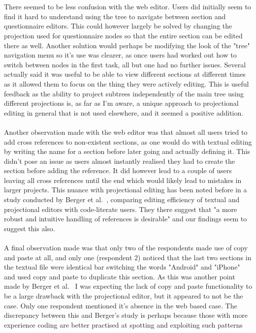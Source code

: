 \documentclass{article}
\begin{document}
\\
\\
There seemed to be less confusion with the web editor. Users did initially seem to find it hard to understand using the tree to navigate between section and questionnaire editors. This could however largely be solved by changing the projection used for questionnaire nodes so that the entire section can be edited there as well. Another solution would perhaps be modifying the look of the "tree" navigation menu so it's use was clearer, as once users had worked out how to switch between nodes in the first task, all but one had no further issues. Several actually said it was useful to be able to view different sections at different times as it allowed them to focus on the thing they were actively editing. This is useful feedback as the ability to project subtrees independently of the main tree using different projections is, as far as I'm aware, a unique approach to projectional editing in general that is not used elsewhere, and it seemed a positive addition.
\\
\\
Another observation made with the web editor was that almost all users tried to add cross references to non-existent sections, as one would do with textual editing by writing the name for a section before later going and actually defining it. This didn't pose an issue as users almost instantly realised they had to create the section before adding the reference. It did however lead to a couple of users leaving all cross references until the end which would likely lead to mistakes in larger projects. This nuance with projectional editing has been noted before in a study conducted by Berger et al.~\cite{projEditControlledExperiment}, comparing editing efficiency of textual and projectional editors with code-literate users. They there suggest that "a more robust and intuitive handling of references is desirable" and our findings seem to suggest this also.
\\
\\
A final observation made was that only two of the respondents made use of copy and paste at all, and only one (respondent 2) noticed that the last two sections in the textual file were identical bar switching the words "Android" and "iPhone" and used copy and paste to duplicate this section. As this was another point made by Berger et al.~\cite{projEditControlledExperiment} I was expecting the lack of copy and paste functionality to be a large drawback with the projectional editor, but it appeared to not be the case. Only one respondent mentioned it's absence in the web based case. The discrepancy between this and Berger's study is perhaps because those with more experience coding are better practised at spotting and exploiting such patterns 
\end{document}
